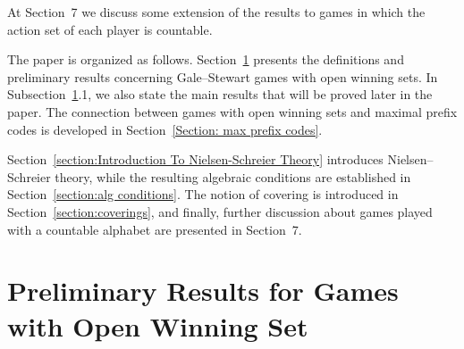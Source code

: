 \documentclass[a4,12pt]{article}%
\begin{document}
At Section~7 we discuss some extension of the results to games in which the action set of each player is countable.

\medskip

The paper is organized as follows.
Section~\ref{section: perliminaries open sets} presents the definitions and preliminary results concerning Gale–Stewart games with open winning sets. In Subsection~\ref{section: perliminaries open sets}.1, we also state the main results that will be proved later in the paper. The connection between games with open winning sets and maximal prefix codes is developed in Section~\ref{Section: max prefix codes}.

Section~\ref{section:Introduction To Nielsen-Schreier Theory} introduces Nielsen–Schreier theory, while the resulting algebraic conditions are established in Section~\ref{section:alg conditions}. The notion of covering is introduced in Section~\ref{section:coverings}, and finally, further discussion about games played with a countable alphabet are presented in Section~{7}. 


\section{Preliminary Results for Games with Open Winning Set}
\label{section: perliminaries open sets}
\end{document}
